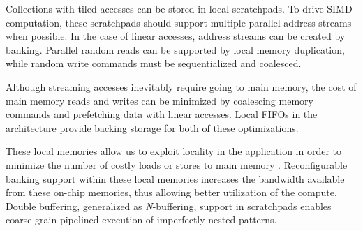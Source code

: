 
Collections with tiled accesses can be stored in local scratchpads.
To drive SIMD computation, these scratchpads should support multiple parallel address streams when possible.
In the case of linear accesses, address streams can be created by banking.
Parallel random reads can be supported by local memory duplication, while random write commands must be sequentialized and coalesced.

Although streaming accesses inevitably require going to main memory, the cost of main memory reads and writes can be minimized by coalescing memory commands and prefetching
data with linear accesses. Local FIFOs in the architecture provide backing storage for both of these optimizations.













These local memories allow us to exploit locality
in the application in order to minimize the number of costly loads or
stores to main memory \cite{dark}. Reconfigurable banking support within these
local memories increases the bandwidth available from these on-chip
memories, thus allowing better utilization of the compute. Double
buffering, generalized as \emph{N}-buffering, support in scratchpads
enables coarse-grain pipelined execution of imperfectly nested
patterns.

